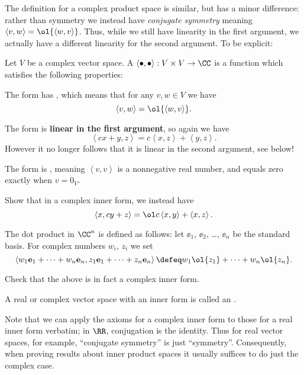 The definition for a complex product space is similar, but has a minor difference:
rather than symmetry we instead have \emph{conjugate symmetry}
meaning $\left< v, w \right> = \ol{ \left< w,v \right> }$.
Thus, while we still have linearity in the first argument,
we actually have a different linearity for the second argument.
To be explicit:
\begin{definition}
	Let $V$ be a complex vector space.
	A  $\left< \bullet, \bullet \right> : V \times V \to \CC$
	is a function which satisfies the following properties:
	\begin{itemize}
		\ii The form has , which means that
		for any $v,w \in V$ we have
		\[ \left< v,w \right> = \ol{\left< w,v\right>}. \]

		\ii The form is \textbf{linear in the first argument}, so again we have
		\[ \left< cx+y, z \right> = c \left< x,z \right> + \left< y,z \right>. \]
		However it no longer follows that it is linear in the second argument, see below!

		\ii The form is ,
		meaning $\left<v,v\right>$ is a nonnegative real number,
		and equals zero exactly when $v = 0_V$.
	\end{itemize}
\end{definition}
\begin{ques}
	Show that in a complex inner form, we instead have
	\[ \left< x, cy + z \right> = \ol c \left< x, y \right> + \left< x, z\right>.  \]
\end{ques}

\begin{example}
	[$\CC^n$]
	The dot product in $\CC^n$ is defined as follows:
	let $\ee_1$, $\ee_2$, \dots, $\ee_n$ be the standard basis.
	For complex numbers $w_i$, $z_i$ we set
	\[ 
		\left< w_1 \ee_1 + \dots + w_n \ee_n, z_1 \ee_1 + \dots + z_n \ee_n \right>
		\defeq w_1\ol{z_1} + \dots + w_n \ol{z_n}.
	\]
\end{example}
\begin{ques}
	Check that the above is in fact a complex inner form.
\end{ques}

\begin{definition}
	A real or complex vector space with an inner form is called
	an .
\end{definition}
\begin{remark}
	\label{rem:only_complex_forms}
	Note that we can apply the axioms for a complex inner form
	to those for a real inner form verbatim; in $\RR$, conjugation is the identity.
	Thus for real vector spaces, for example, ``conjugate symmetry'' is just ``symmetry''.
	Consequently, when proving results about inner product spaces it usually
	suffices to do just the complex case.
\end{remark}

